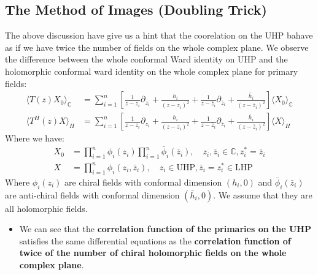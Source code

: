 \subsection{The Method of Images (Doubling Trick)}\label{sec:Method of Images}


The above discussion have give us a hint that the coorelation on the UHP bahave as if we have twice the number of fields on the whole complex plane. We observe the difference between the whole conformal Ward identity on UHP and the holomorphic conformal ward identity on the whole complex plane for primary fields:
\begin{align}
  \langle T(z) X_0 \rangle_{\mathbb{C}}& = \sum_{i=1}^n \left[ \frac{1}{z - z_i} \partial_{z_i} + \frac{h_i}{(z - z_i)^2} + \frac{1}{z - \bar{z}_i} \partial_{\bar{z}_i} + \frac{\bar{h}_i}{(z - \bar{z}_i)^2}\right] \langle X_0 \rangle_{\mathbb{C}}\\ 
  \langle T^H(z) X \rangle_{H} &= \sum_{i=1}^n \left[ \frac{1}{z - z_i} \partial_{z_i} + \frac{h_i}{(z - z_i)^2} + \frac{1}{z - \bar{z}_i} \partial_{\bar{z}_i} + \frac{\bar{h}_i}{(z - \bar{z}_i)^2}\right] \langle X \rangle_{H}
\end{align}
Where we have:
\begin{align}
  X_0 &= \prod_{i=1}^n \phi_i(z_i) \prod_{i=1}^n \bar{\phi}_i(\bar{z}_i), \quad z_i , \bar{z}_i \in \mathbb{C} , z_i^* = \bar{z}_i \\
  X &= \prod_{i=1}^n \phi_i(z_i,\bar{z}_i) , \quad z_i \in \text{UHP} , \bar{z}_i = z_i^* \in \text{LHP}
\end{align}
Where $ \phi_i(z_i) $ are chiral fields with conformal dimension $ (h_i,0) $ and $ \bar{\phi}_i(\bar{z}_i) $ are anti-chiral fields with conformal dimension $ (\bar{h}_i, 0) $. We assume that they are all holomorphic fields.
\begin{itemize}
  \item We can see that the \textbf{correlation function of the primaries on the UHP} satisfies the same differential equations as the \textbf{correlation function of twice of the number of chiral holomorphic fields on the whole complex plane}.
\end{itemize}


